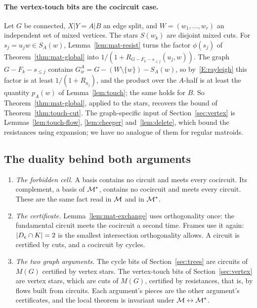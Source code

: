 \paragraph{The vertex-touch bits are the cocircuit case.} Let $G$ be connected, $X|Y=A|B$ an edge split, and $W=(w_1,\dots,w_r)$ an independent set of mixed vertices. The stars $S(w_k)$ are disjoint mixed cuts. For $s_j=u_jw\in S_A(w)$, Lemma~\ref{lem:mat-resist} turns the factor $\phi(s_j)$ of Theorem~\ref{thm:mat-global} into $1/(1+R_{G-F_k-s_{\le j}}(u_j,w))$. The graph $G-F_k-s_{\le j}$ contains $G_w^A=G-(W\setminus\{w\})-S_A(w)$, so by~\ref{E:rayleigh} this factor is at least $1/(1+R_{u_j})$, and the product over the $A$-half is at least the quantity $p_A(w)$ of Lemma~\ref{lem:touch}; the same holds for $B$. So Theorem~\ref{thm:mat-global}, applied to the stars, recovers the bound of Theorem~\ref{thm:touch-cut}. The graph-specific input of Section~\ref{sec:vertex} is Lemmas~\ref{lem:touch-flow}, \ref{lem:cheeger} and~\ref{lem:delete}, which bound the resistances using expansion; we have no analogue of them for regular matroids.

\subsection{The duality behind both arguments}

\begin{enumerate}
\item \emph{The forbidden cell.} A basis contains no circuit and meets every cocircuit. Its complement, a basis of $\mathcal{M}^*$, contains no cocircuit and meets every circuit. These are the same fact read in $\mathcal{M}$ and in $\mathcal{M}^*$.
\item \emph{The certificate.} Lemma~\ref{lem:mat-exchange} uses orthogonality once: the fundamental circuit meets the cocircuit a second time. Frames use it again: $\lvert D_e\cap K\rvert=2$ is the smallest intersection orthogonality allows. A circuit is certified by cuts, and a cocircuit by cycles.
\item \emph{The two graph arguments.} The cycle bits of Section~\ref{sec:trees} are circuits of $M(G)$ certified by vertex stars. The vertex-touch bits of Section~\ref{sec:vertex} are vertex stars, which are cuts of $M(G)$, certified by resistances, that is, by flows built from circuits. Each argument's pieces are the other argument's certificates, and the local theorem is invariant under $\mathcal{M}\leftrightarrow\mathcal{M}^*$.
\end{enumerate}
